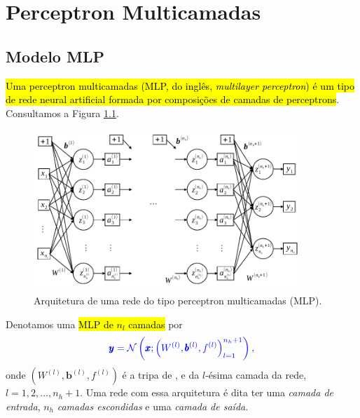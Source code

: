 
\chapter{Perceptron Multicamadas}\label{cap_mlp}
\thispagestyle{fancy}

\section{Modelo MLP}\label{cap_mlp_sec_modelo}

\hl{Uma perceptron multicamadas (MLP, do inglês, \textit{multilayer perceptron}) é um tipo de rede neural artificial formada por composições de camadas de perceptrons}. Consultamos a Figura \ref{cap_mlp_sec_modelo}.

\begin{figure}[H]
  \centering
  \includegraphics[width=0.9\textwidth]{./cap_mlp/dados/fig_mlp/fig}
  \caption{Arquitetura de uma rede do tipo perceptron multicamadas (MLP).}
  \label{fig:cap_mlp_sec_modelo:fig:mlp}
\end{figure}

Denotamos uma \hl{MLP de $n_l$ camadas} por
\begin{equation}\color{blue}\pmb{y} = \mathcal{N}\left(\pmb{x}; \left(W^{(l)}, \pmb{b}^{(l)}, f^{(l)}\right)_{l=1}^{n_h+1}\right),
\end{equation}
onde $\left(W^{(l)}, \pmb{b}^{(l)}, f^{(l)}\right)$ é a tripa de ,  e  da $l$-ésima camada da rede, $l=1, 2, \dotsc, n_h+1$. Uma rede com essa arquitetura é dita ter uma \emph{camada de entrada}, $n_h$ \emph{camadas escondidas} e uma \emph{camada de saída}.

